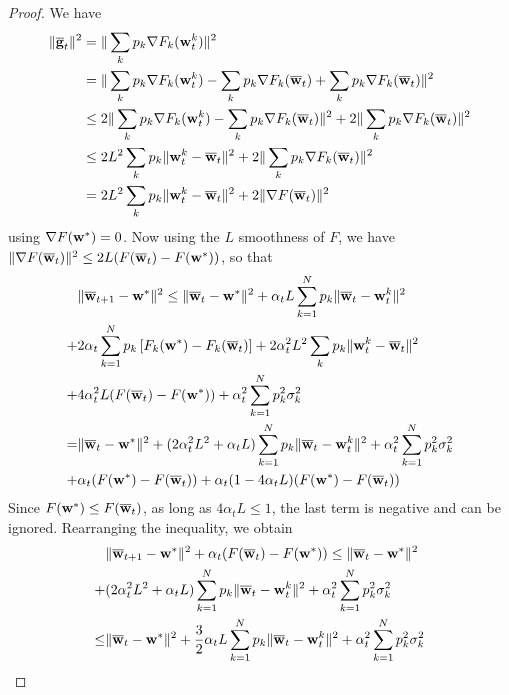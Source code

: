 \begin{proof}
	We have
	\begin{align*}
	\|{\overline{\mathbf{g}}}_{t}\|^{2} & =\|\sum_{k}p_{k}\nabla F_{k}({\mathbf{w}}_{t}^{k})\|^{2}\\
	& =\|\sum_{k}p_{k}\nabla F_{k}({\mathbf{w}}_{t}^{k})-\sum_{k}p_{k}\nabla F_{k}({\overline{\mathbf{w}}}_{t})+\sum_{k}p_{k}\nabla F_{k}({\overline{\mathbf{w}}}_{t})\|^{2}\\
	& \leq2\|\sum_{k}p_{k}\nabla F_{k}({\mathbf{w}}_{t}^{k})-\sum_{k}p_{k}\nabla F_{k}({\overline{\mathbf{w}}}_{t})\|^{2}+2\|\sum_{k}p_{k}\nabla F_{k}({\overline{\mathbf{w}}}_{t})\|^{2}\\
	& \leq2L^{2}\sum_{k}p_{k}\|{\mathbf{w}}_{t}^{k}-{\overline{\mathbf{w}}}_{t}\|^{2}+2\|\sum_{k}p_{k}\nabla F_{k}({\overline{\mathbf{w}}}_{t})\|^{2}\\
	& =2L^{2}\sum_{k}p_{k}\|{\mathbf{w}}_{t}^{k}-{\overline{\mathbf{w}}}_{t}\|^{2}+2\|\nabla F({\overline{\mathbf{w}}}_{t})\|^{2}
	\end{align*}
	using $\nabla F({\mathbf{w}}^{\ast})=0$. Now using the $L$ smoothness of $F$,
	we have $\|\nabla F({\overline{\mathbf{w}}}_{t})\|^{2}\leq2L(F({\overline{\mathbf{w}}}_{t})-F({\mathbf{w}}^{\ast}))$,
	so that 
	\begin{align*}
	& \|{\overline{\mathbf{w}}}_{t+1}-{\mathbf{w}}^{\ast}\|^{2} \leq  \|{\overline{\mathbf{w}}}_{t}-{\mathbf{w}}^{\ast}\|^{2}+\alpha_{t}L\sum_{k=1}^{N}p_{k}\|{\overline{\mathbf{w}}}_{t}-{\mathbf{w}}_{t}^{k}\|^{2}\\
	+&2\alpha_{t}\sum_{k=1}^{N}p_{k}\left[F_{k}({\mathbf{w}}^{\ast})-F_{k}({\overline{\mathbf{w}}}_{t})\right]+2\alpha_{t}^{2}L^{2}\sum_{k}p_{k}\|{\mathbf{w}}_{t}^{k}-{\overline{\mathbf{w}}}_{t}\|^{2}\\
	+&4\alpha_{t}^{2}L(F({\overline{\mathbf{w}}}_{t})-F({\mathbf{w}}^{\ast}))+\alpha_{t}^{2}\sum_{k=1}^{N}p_{k}^{2}\sigma_{k}^{2}\\
	= & \|{\overline{\mathbf{w}}}_{t}-{\mathbf{w}}^{\ast}\|^{2}+(2\alpha_{t}^{2}L^{2}+\alpha_{t}L)\sum_{k=1}^{N}p_{k}\|{\overline{\mathbf{w}}}_{t}-{\mathbf{w}}_{t}^{k}\|^{2}+\alpha_{t}^{2}\sum_{k=1}^{N}p_{k}^{2}\sigma_{k}^{2} \\ 
	 +& \alpha_{t}(F({\mathbf{w}}^{\ast})-F({\overline{\mathbf{w}}}_{t}))
	 +\alpha_{t}(1-4\alpha_{t}L)(F({\mathbf{w}}^{\ast})-F({\overline{\mathbf{w}}}_{t}))
	\end{align*}
	Since $F({\mathbf{w}}^{\ast})\leq F({\overline{\mathbf{w}}}_{t})$, as long as $4\alpha_{t}L\leq1$,
	the last term is negative and can be ignored. Rearranging the inequality, we obtain
	\begin{align*}
	& \|{\overline{\mathbf{w}}}_{t+1}-{\mathbf{w}}^{\ast}\|^{2}+\alpha_{t}(F({\overline{\mathbf{w}}}_{t})-F({\mathbf{w}}^{\ast}))
 \leq \|{\overline{\mathbf{w}}}_{t}-{\mathbf{w}}^{\ast}\|^{2}\\
 +& (2\alpha_{t}^{2}L^{2}+\alpha_{t}L)\sum_{k=1}^{N}p_{k}\|{\overline{\mathbf{w}}}_{t}-{\mathbf{w}}_{t}^{k}\|^{2}+\alpha_{t}^{2}\sum_{k=1}^{N}p_{k}^{2}\sigma_{k}^{2}\\
	\leq & \|{\overline{\mathbf{w}}}_{t}-{\mathbf{w}}^{\ast}\|^{2}+\frac{3}{2}\alpha_{t}L\sum_{k=1}^{N}p_{k}\|{\overline{\mathbf{w}}}_{t}-{\mathbf{w}}_{t}^{k}\|^{2}+\alpha_{t}^{2}\sum_{k=1}^{N}p_{k}^{2}\sigma_{k}^{2}
	\end{align*}
	

\end{proof}
